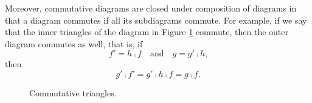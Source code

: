 \begin{remark}
  \label{re:commutative-diagram}


  Moreover, commutative diagrams are closed under composition of
  diagrams in that a diagram commutes if all its subdiagrams commute.
  For example, if we say that the inner triangles of the diagram in
  Figure \ref{fig:commutative-triangles} commute, then the outer
  diagram commutes as well, that is, if
  \begin{equation*}
    f' = h \comp f
    \quad
    \text{and}
    \quad
    g = g' \comp h
    \text{,}
  \end{equation*}
  then
  \begin{equation*}
    g' \comp f' = g' \comp h \comp f = g \comp f
    \text{.}
  \end{equation*}

  \begin{figure}[htb]
    \begin{center}
    \end{center}
    \caption{Commutative triangles.}
    \label{fig:commutative-triangles}
  \end{figure}

\end{remark}

